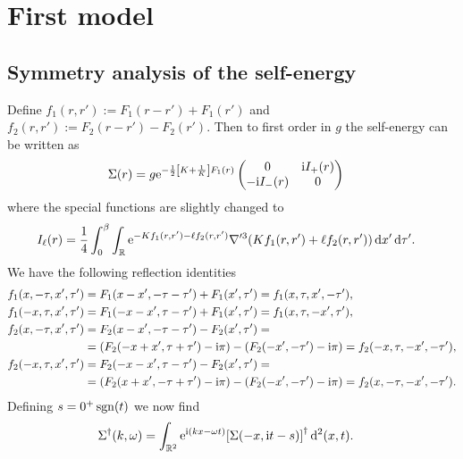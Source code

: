 \documentclass[english, parskip=full]{scrartcl}
\title{\titel}
\author{\autor}
\date{\today}
\begin{document}
\maketitle  %

\section{First model}
\subsection{Symmetry analysis of the self-energy}
Define $f_1(r,r') := F_1(r-r') + F_1(r')$ and $f_2(r,r') := F_2(r-r') - F_2(r')$.
Then to first order in $g$ the self-energy can be written as
\begin{align}
\Sigma(r) &= g\powe{-\frac{1}{2} \klb*{K + \frac{1}{K}}F_1(r)} \begin{pmatrix}
0 & \i I_+(r) \\ -\i I_-(r) & 0
\end{pmatrix}
\end{align}
where the special functions are slightly changed to
\begin{align}
I_\ell(r) &= \frac{1}{4} \intx{0}{\beta}{\intr{\powe{-Kf_1(r,r') - \ell f_2(r,r')} \nabla'^3 \kla*{Kf_1(r,r') + \ell f_2(r,r')}}{x'}}{\tau'}.
\end{align}
We have the following reflection identities
\begin{align}
f_1(x,-\tau, x',\tau') &= F_1(x-x',-\tau-\tau') + F_1(x',\tau') = f_1(x,\tau,x',-\tau'),\\
f_1(-x,\tau,x',\tau') &= F_1(-x-x',\tau-\tau') + F_1(x',\tau') = f_1(x,\tau,-x',\tau'),\\
f_2(x,-\tau,x',\tau') &= F_2(x-x',-\tau-\tau') - F_2(x',\tau') = \\
&= \kla*{F_2(-x+x',\tau + \tau') -\i\pi} - \kla*{F_2(-x',-\tau') - \i\pi} = f_2(-x,\tau,-x',-\tau'),\\
f_2(-x,\tau,x',\tau') &= F_2(-x-x',\tau-\tau') - F_2(x',\tau') = \\
&= \kla*{F_2(x+x',-\tau + \tau') -\i\pi} - \kla*{F_2(-x',-\tau') - \i\pi} = f_2(x,-\tau,-x',-\tau').
\end{align}
Defining $s=0^+ \sgn(t)$ we now find
\begin{align}
\Sigma^\dagger(k,\omega) &= \intrnd{2}{\powe{\i (kx-\omega t)} \klb*{\Sigma \kla*{-x, \i t - s}}^\dagger}{(x,t)}.
\end{align}
\end{document}
